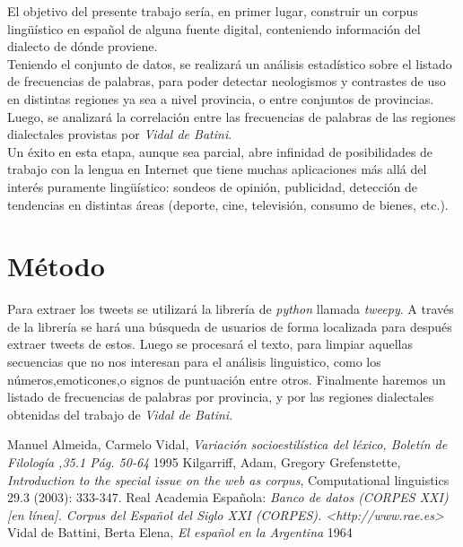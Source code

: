 \documentclass[a4paper,11pt]{article}
\begin{document}
El objetivo del presente trabajo sería, en primer lugar, construir un corpus lingüístico en español de alguna fuente digital, conteniendo información del dialecto de dónde proviene. \\

Teniendo el conjunto de datos, se realizará un análisis estadístico sobre el listado de frecuencias de palabras, para poder detectar neologismos y contrastes de uso en distintas regiones ya sea a nivel provincia, o entre conjuntos de provincias. Luego, se analizará la correlación entre las frecuencias de palabras de las regiones dialectales provistas por \emph{Vidal de Batini}\cite{VIDAL1964}.\\

Un éxito en esta etapa, aunque sea parcial, abre infinidad de posibilidades de trabajo con la lengua en Internet que tiene muchas aplicaciones más allá del interés puramente lingüístico: sondeos de opinión, publicidad, detección de tendencias en distintas áreas (deporte, cine, televisión, consumo de bienes, etc.).   


\section*{Método}

Para extraer los tweets se utilizará la librería de \textit{python} llamada \textit{tweepy}.
A través de la librería se hará una búsqueda de usuarios de forma localizada para después extraer tweets de estos.
Luego se procesará el texto, para limpiar aquellas secuencias que no nos interesan para el análisis linguistico,
como los números,emoticones,o signos de puntuación entre otros.
Finalmente haremos un listado de frecuencias de palabras por provincia,
y por las regiones dialectales obtenidas del trabajo de  \emph{Vidal de Batini}.


\begin{thebibliography}{9}
    Manuel Almeida, Carmelo Vidal,
    \emph{Variación socioestilística del léxico, Boletín de Filología ,35.1 Pág. 50-64}
    1995
   Kilgarriff, Adam, Gregory Grefenstette,
   \emph{Introduction to the special issue on the web as corpus},
   Computational linguistics 29.3 (2003): 333-347.
    Real Academia Española:
    \emph{Banco de datos (CORPES XXI) [en línea]. Corpus del Español del
    Siglo XXI (CORPES). <http://www.rae.es>}
    Vidal de Battini, Berta Elena,
    \emph{El español en la Argentina}
    1964

\end{thebibliography}
\end{document}
